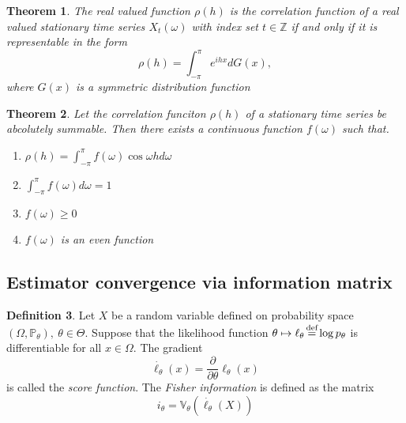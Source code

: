 \documentclass[12pt]{article}
\newtheorem{theorem}{Theorem}[section]
\theoremstyle{definition}
\newtheorem{definition}[theorem]{Definition}
\theoremstyle{remark}
\numberwithin{equation}{section}
\newcommand{\PP}{\mathbb{P}}
\newcommand{\ZZ}{\mathbb{Z}}
\newcommand{\VV}{\mathbb{V}}
\newcommand{\eq}{\stackrel{\mathclap{\normalfont\text{def}}}{=}}
\begin{document}
\begin{theorem}
	The real valued function $\rho(h)$ is the correlation function of a real valued stationary time series $X_t(\omega)$ with index set $t\in\ZZ$ if and only if it is representable in the form
\begin{equation*}
	\rho(h) = \int_{-\pi}^\pi e^{ihx}dG(x),
\end{equation*}
	where $G(x)$ is a symmetric distribution function
\end{theorem}

\begin{theorem}
	Let the correlation funciton $\rho(h)$ of a stationary time series be abcolutely summable. Then there exists a continuous function $f(\omega)$ such that.
	\begin{enumerate}
		\item $\rho(h) = \int_{-\pi}^{\pi}f(\omega)\cos \omega h d\omega$
		\item $\int_{-\pi}^{\pi}f(\omega)d\omega = 1$
		\item $f(\omega)\geq 0$
		\item $f(\omega)$ is an even function
	\end{enumerate}
\end{theorem}


\subsection{Estimator convergence via information matrix}

\begin{definition}\label{information_def}
Let $X$ be a random variable defined on probability space $(\Omega,\PP_\theta),\ \theta\in\Theta$. Suppose that the likelihood function $\theta\mapsto\ell_\theta \eq \log p_\theta$ is differentiable for all $x\in\Omega$. The gradient
\begin{equation*}
	\dot{\ell_\theta}(x) = \frac{\partial}{\partial\theta}\ell_\theta(x)
\end{equation*}
is called the \emph{score function}. The \emph{Fisher information} is defined as the matrix
\begin{equation*}
	i_\theta = \VV_\theta\left(\dot{\ell_\theta}(X)\right)
\end{equation*}
\end{definition}
\end{document}
